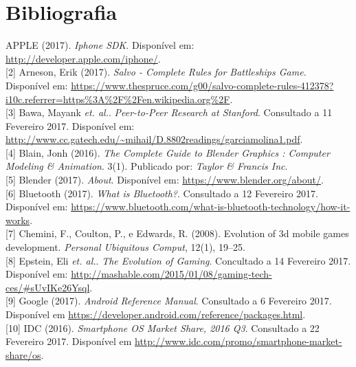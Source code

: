 \chapter{Bibliografia}
\label{Bibliografia}

\quad [1] APPLE (2017). \textit{Iphone SDK}.  Disponível em: \url{http://developer.apple.com/iphone/}. \\

[2] Arneson, Erik (2017). \textit{Salvo - Complete Rules for Battleships Game}.  Disponível em: \url{https://www.thespruce.com/g00/salvo-complete-rules-412378?i10c.referrer=https\%3A\%2F\%2Fen.wikipedia.org\%2F}. \\

[3] Bawa, Mayank \textit{et. al.}. \textit{Peer-to-Peer Research at Stanford}. Consultado a 11 Fevereiro 2017. Disponível em: \url{http://www.cc.gatech.edu/~mihail/D.8802readings/garciamolina1.pdf}. \\

[4] Blain, Jonh (2016).  \textit{The Complete Guide to Blender Graphics : Computer Modeling \& Animation}. 3(1). Publicado por: \textit{Taylor \& Francis Inc}.  \\

[5] Blender (2017). \textit{About}.  Disponível em: \url{https://www.blender.org/about/}. \\

[6] Bluetooth (2017). \textit{What is Bluetooth?}. Consultado a 12 Fevereiro 2017. Disponível em: \url{https://www.bluetooth.com/what-is-bluetooth-technology/how-it-works}. \\

[7] Chemini, F., Coulton, P., e Edwards, R. (2008). Evolution of 3d mobile games development.
\textit{Personal Ubiquitous Comput}, 12(1), 19–25. \\

[8] Epstein, Eli \textit{et. al.}. \textit{The Evolution of Gaming}. Concultado a 14 Fevereiro 2017. Disponível em: \url{http://mashable.com/2015/01/08/gaming-tech-ces/#sUvIKe26Ysql}. \\

[9] Google (2017). \textit{Android Reference Manual}. Consultado a 6 Fevereiro 2017. Disponível em \url{https://developer.android.com/reference/packages.html}. \\

[10] IDC (2016). \textit{Smartphone OS Market Share, 2016 Q3}. Consultado a 22 Fevereiro 2017. Disponível em \url{http://www.idc.com/promo/smartphone-market-share/os}. \\

